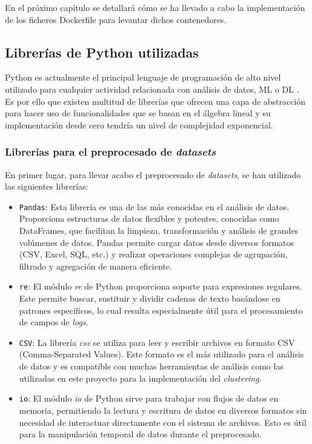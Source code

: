 En el próximo capítulo se detallará cómo se ha llevado a cabo la implementación de los ficheros Dockerfile para levantar dichos contenedores.

\subsection{Librerías de Python utilizadas}

Python es actualmente el principal lenguaje de programación de alto nivel utilizado para cualquier actividad relacionada con análisis de datos, \gls{ML} o \gls{DL} \cite{subasi2020practical}. Es por ello que existen multitud de librerías que ofrecen una capa de abstracción para hacer uso de funcionalidades que se basan en el álgebra lineal y su implementación desde cero tendría un nivel de complejidad exponencial.

\vspace{-2mm}

\newpage

\subsubsection*{Librerías para el preprocesado de \textit{datasets}}

En primer lugar, para llevar acabo el preprocesado de \textit{datasets}, se han utilizado las siguientes librerías:

\begin{itemize}
\item \texttt{\gls{Pandas}}: Esta librería es una de las más conocidas en el análisis de datos. Proporciona estructuras de datos flexibles y potentes, conocidas como DataFrames, que facilitan la limpieza, transformación y análisis de grandes volúmenes de datos. Pandas permite cargar datos desde diversos formatos (CSV, Excel, SQL, etc.) y realizar operaciones complejas de agrupación, filtrado y agregación de manera eficiente. \\
\item \texttt{\gls{re}}: El módulo \textit{re} de Python proporciona soporte para expresiones regulares. Este permite buscar, sustituir y dividir cadenas de texto basándose en patrones específicos, lo cual resulta especialmente útil para el procesamiento de campos de \textit{logs}. \\
\item \texttt{\gls{CSV}}: La librería \textit{csv} se utiliza para leer y escribir archivos en formato \gls{CSV} (Comma-Separated Values). Este formato es el más utilizado para el análisis de datos y es compatible con muchas herramientas de análisis como las utilizadas en este proyecto para la implementación del \textit{clustering}. \\
\item \texttt{io}: El módulo \textit{io} de Python sirve para trabajar con flujos de datos en memoria, permitiendo la lectura y escritura de datos en diversos formatos sin necesidad de interactuar directamente con el sistema de archivos. Esto es útil para la manipulación temporal de datos durante el preprocesado.
\end{itemize}

